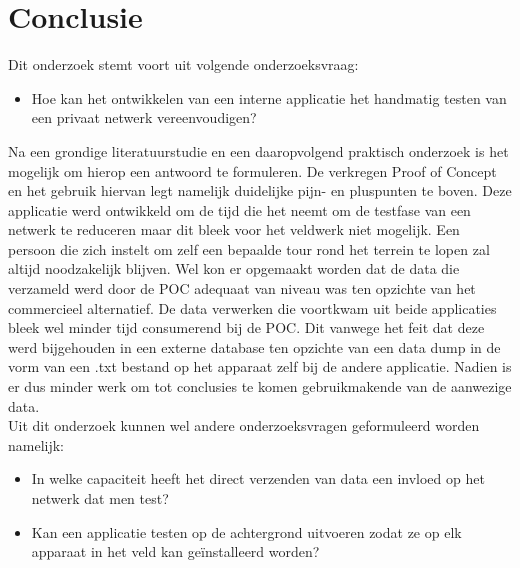 
\chapter{Conclusie}%
\label{ch:conclusie}


Dit onderzoek stemt voort uit volgende onderzoeksvraag:
\begin{itemize}
    \item Hoe kan het ontwikkelen van een interne applicatie het handmatig testen van een privaat netwerk vereenvoudigen?
\end{itemize}

Na een grondige literatuurstudie en een daaropvolgend praktisch onderzoek is het mogelijk om hierop een antwoord te formuleren. De verkregen Proof of Concept en het gebruik hiervan legt namelijk duidelijke pijn- en pluspunten te boven. Deze applicatie werd ontwikkeld om de tijd die het neemt om de testfase van een netwerk te reduceren maar dit bleek voor het veldwerk niet mogelijk. Een persoon die zich instelt om zelf een bepaalde tour rond het terrein te lopen zal altijd noodzakelijk blijven. Wel kon er opgemaakt worden dat de data die verzameld werd door de POC adequaat van niveau was ten opzichte van het commercieel alternatief. De data verwerken die voortkwam uit beide applicaties bleek wel minder tijd consumerend bij de POC. Dit vanwege het feit dat deze werd bijgehouden in een externe database ten opzichte van een data dump in de vorm van een .txt bestand op het apparaat zelf bij de andere applicatie. Nadien is er dus minder werk om tot conclusies te komen gebruikmakende van de aanwezige data. \\

Uit dit onderzoek kunnen wel andere onderzoeksvragen geformuleerd worden namelijk:
\begin{itemize}
    \item In welke capaciteit heeft het direct verzenden van data een invloed op het netwerk dat men test?
    \item Kan een applicatie testen op de achtergrond uitvoeren zodat ze op elk apparaat in het veld kan geïnstalleerd worden?
\end{itemize}

